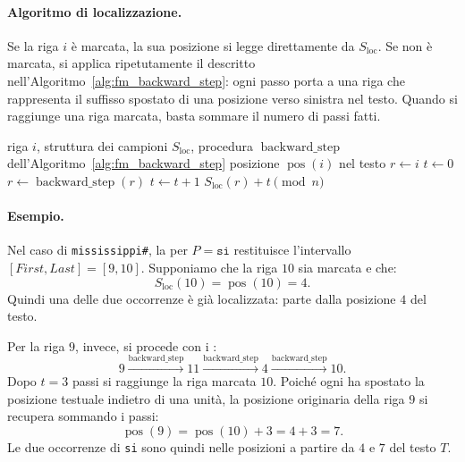 \documentclass{article}
\theoremstyle{definition}
\numberwithin{equation}{section}
\begin{document}
\paragraph{Algoritmo di localizzazione.}
Se la riga $i$ è marcata, la sua posizione si legge direttamente da $S_{\operatorname{loc}}$. Se non è marcata, si applica ripetutamente il  descritto nell'Algoritmo~\ref{alg:fm_backward_step}: ogni passo porta a una riga che rappresenta il suffisso spostato di una posizione verso sinistra nel testo. Quando si raggiunge una riga marcata, basta sommare il numero di passi fatti.

\begin{algorithm}[H]
    \caption{Localizzazione di una riga nell'FM-index}
    \label{alg:fm_locate_row}
    \begin{algorithmic}[1]
        \Require riga $i$, struttura dei campioni $S_{\operatorname{loc}}$, procedura $\operatorname{backward\_step}$ dell'Algoritmo~\ref{alg:fm_backward_step}
        \Ensure posizione $\operatorname{pos}(i)$ nel testo
        \State $r\gets i$
        \State $t\gets 0$
        \State $r\gets \operatorname{backward\_step}(r)$
        \State $t\gets t+1$
        \EndWhile
        \State \Return $S_{\operatorname{loc}}(r)+t \pmod n$
    \end{algorithmic}
\end{algorithm}

\paragraph{Esempio.}
Nel caso di \texttt{mississippi\#}, la  per $P=\texttt{si}$ restituisce l'intervallo $[\textit{First},\textit{Last}]=[9,10]$. Supponiamo che la riga $10$ sia marcata e che:
\[
    S_{\operatorname{loc}}(10)=\operatorname{pos}(10)=4.
\]
Quindi una delle due occorrenze è già localizzata: parte dalla posizione $4$ del testo.

Per la riga $9$, invece, si procede con i :
\[
    9
    \xrightarrow{\operatorname{backward\_step}}
    11
    \xrightarrow{\operatorname{backward\_step}}
    4
    \xrightarrow{\operatorname{backward\_step}}
    10.
\]
Dopo $t=3$ passi si raggiunge la riga marcata $10$. Poiché ogni  ha spostato la posizione testuale indietro di una unità, la posizione originaria della riga $9$ si recupera sommando i passi:
\[
    \operatorname{pos}(9)
    =
    \operatorname{pos}(10)+3
    =
    4+3
    =
    7.
\]
Le due occorrenze di \texttt{si} sono quindi nelle posizioni a partire da $4$ e $7$ del testo $T$.
\end{document}
